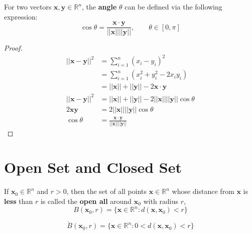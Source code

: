 \begin{definition}
    For two vectors $\mathbf{x}, \mathbf{y} \in \mathbb{R}^{n}$, the \textbf{angle} $\theta$ can be defined via the following expression: \begin{equation*}
        \cos\theta=\frac{\mathbf{x}\cdot\mathbf{y}}{||\mathbf{x}||||\mathbf{y}||}, \qquad \theta \in [0,\pi]
    \end{equation*}
\end{definition}

\begin{proof}
    \begin{align*}
        ||\mathbf{x}-\mathbf{y}||^{2} & = \sum_{i=1}^{n} (x_i-y_i)^{2}                                            \\
                                      & = \sum_{i=1}^{n} (x_{i}^{2} + y_{i}^{2} - 2x_{i}y_{i})                    \\
                                      & = ||\mathbf{x}||+||\mathbf{y}||-2 \mathbf{x}\cdot\mathbf{y}               \\
        ||\mathbf{x}-\mathbf{y}||^{2} & = ||\mathbf{x}|| + ||\mathbf{y}||-2||\mathbf{x}||||\mathbf{y}||\cos\theta \\
        2 \mathbf{x}\mathbf{y}        & = 2||\mathbf{x}||||\mathbf{y}||\cos\theta                                 \\
        \cos\theta                    & =\frac{\mathbf{x}\cdot\mathbf{y}}{||\mathbf{x}||||\mathbf{y}||}
    \end{align*}
\end{proof}

\section{Open Set and Closed Set}

\begin{definition}
    If $\mathbf{x}_0\in \mathbb{R}^{n}$ and $r > 0$, then the set of all points $\mathbf{x} \in \mathbb{R}^{n}$ whose distance from $\mathbf{x}$ is \textbf{less} than $r$ is called the \textbf{open all} around $\mathbf{x}_0$ with radius $r$, \begin{equation*}
        B(\mathbf{x}_0,r) = \{\mathbf{x} \in \mathbb{R}^{n}: d(\mathbf{x},\mathbf{x}_0) < r\}
    \end{equation*}
\end{definition}

\begin{remark*}
    \begin{equation*}
        \mathring{B}(\mathbf{x}_0,r) = \{\mathbf{x} \in \mathbb{R}^{n}: 0 < d(\mathbf{x},\mathbf{x}_0) < r\}
    \end{equation*}
\end{remark*}

